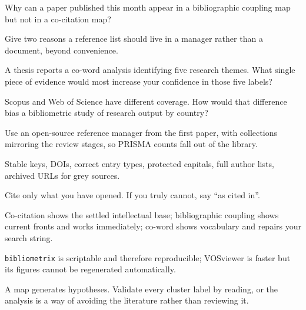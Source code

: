 \begin{checkpoint}
\begin{tightnum}
  \item Why can a paper published this month appear in a bibliographic coupling
    map but not in a co-citation map?
  \item Give two reasons a reference list should live in a manager rather than
    a document, beyond convenience.
  \item A thesis reports a co-word analysis identifying five research themes.
    What single piece of evidence would most increase your confidence in those
    five labels?
  \item Scopus and Web of Science have different coverage. How would that
    difference bias a bibliometric study of research output by country?
\end{tightnum}
\end{checkpoint}

\begin{chaptersummary}
\begin{tight}
  \item Use an open-source reference manager from the first paper, with
    collections mirroring the review stages, so PRISMA counts fall out of the
    library.
  \item Stable keys, DOIs, correct entry types, protected capitals, full author
    lists, archived URLs for grey sources.
  \item Cite only what you have opened. If you truly cannot, say ``as cited
    in''.
  \item Co-citation shows the settled intellectual base; bibliographic coupling
    shows current fronts and works immediately; co-word shows vocabulary and
    repairs your search string.
  \item \texttt{bibliometrix} is scriptable and therefore reproducible;
    VOSviewer is faster but its figures cannot be regenerated automatically.
  \item A map generates hypotheses. Validate every cluster label by reading, or
    the analysis is a way of avoiding the literature rather than reviewing it.
\end{tight}
\end{chaptersummary}

